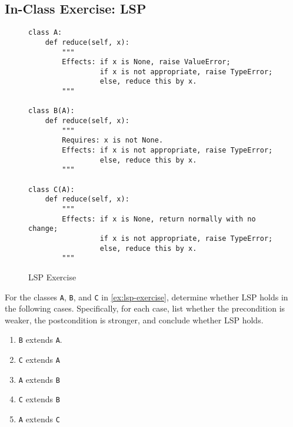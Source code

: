 \documentclass[oneside,11pt,dvipsnames]{book}
\newcommand{\sol}[1]{\iftoggle{usesol}{\textbf{Sol:} #1}{}}
\newcommand{\code}[1]{\texttt{#1}}
\begin{document}
\subsection{In-Class Exercise: LSP}
\begin{figure}
\begin{lstlisting}
class A:
    def reduce(self, x):
        """
        Effects: if x is None, raise ValueError;
                 if x is not appropriate, raise TypeError;
                 else, reduce this by x.
        """

class B(A):
    def reduce(self, x):
        """
        Requires: x is not None.
        Effects: if x is not appropriate, raise TypeError;
                 else, reduce this by x.
        """

class C(A):
    def reduce(self, x):
        """
        Effects: if x is None, return normally with no change;
                 if x is not appropriate, raise TypeError;
                 else, reduce this by x.
        """
\end{lstlisting}
\caption{LSP Exercise}\label{ex:lsp-exercise}
\end{figure}

For the classes \code{A}, \code{B}, and \code{C} in \autoref{ex:lsp-exercise}, determine whether LSP holds in the following cases. Specifically, for each case, list whether the precondition is weaker, the postcondition is stronger, and conclude whether LSP holds.
\begin{enumerate}
    \item \code{B} extends \code{A}.
    \sol{B's pre is stronger than A's because it requires that $x$ is not None while A's has no pre. \textbf{LSP does not hold}. The posts of \code{A} and \code{B} are the same}
    \item \code{C} extends \code{A}
    \sol{Pre's are the same (both are total methods). C's post is stronger than A's because it allows $x$ to be None while A's does not. \textbf{LSP holds}.}
    \item \code{A} extends \code{B}
    \sol{A's pre is weaker than B's because A has no pre. The posts for both are essentially the same because B's pre explicitly requires $x$ to be not None. \textbf{LSP holds}. Note that you might argue A's post is stronger, which is also fine and also means LSP holds.}
    \item \code{C} extends \code{B}
    \sol{C's pre is weaker than B's because C allows $x$ to be None while B does not. The posts are the same. \textbf{LSP does not hold}.}
    \item \code{A} extends \code{C}
\end{enumerate}
\end{document}

